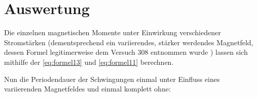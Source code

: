 \section{Auswertung}
\label{sec:Auswertung}

Die einzelnen magnetischen Momente unter Einwirkung verschiedener Stromstärken (dementsprechend ein variierendes, stärker werdendes Magnetfeld, dessen Formel legitimerweise dem Versuch 308 entnommen wurde \cite{v308}) lassen sich mithilfe der \autoref{eq:formel13} und \autoref{eq:formel11} berechnen.


Nun die Periodendauer der Schwingungen einmal unter Einfluss eines variierenden Magnetfeldes und einmal komplett ohne:

